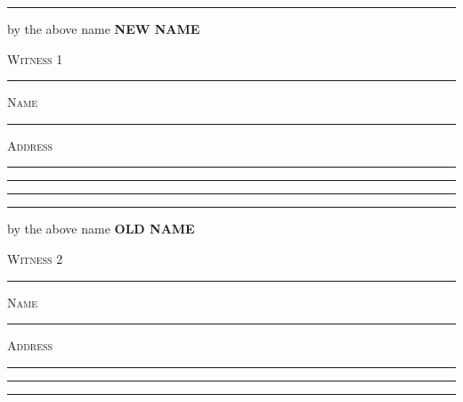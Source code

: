 \documentclass[10pt, twoside, a4paper]{article}
\newcommand{\newname}{\textbf{NEW NAME}}
\newcommand{\oldname}{\textbf{OLD NAME}}
\begin{document}
\vfill

\centering
\begin{minipage}{0.45\textwidth}
	\hrule
	\vspace{10pt}

	{
		\centering
		\noindent
		by the above name \newname{}
		\par
	}

	\vspace{60pt}

	\textsc{Witness 1}
	\vspace{30pt}
	\hrule

	\vspace{20pt}

	\textsc{Name}
	\vspace{20pt}
	\hrule

	\vspace{20pt}

	\textsc{Address}
	\vspace{20pt}
	\hrule
	\vspace{20pt}
	\hrule
	\vspace{20pt}
	\hrule
\end{minipage}
\hspace{0.05\textwidth}
\begin{minipage}{0.45\textwidth}
	\hrule
	\vspace{10pt}

	{
		\centering
		\noindent
		by the above name \oldname{}
		\par
	}

	\vspace{60pt}

	\textsc{Witness 2}
	\vspace{30pt}
	\hrule

	\vspace{20pt}

	\textsc{Name}
	\vspace{20pt}
	\hrule

	\vspace{20pt}

	\textsc{Address}
	\vspace{20pt}
	\hrule
	\vspace{20pt}
	\hrule
	\vspace{20pt}
	\hrule
\end{minipage}
\end{document}
